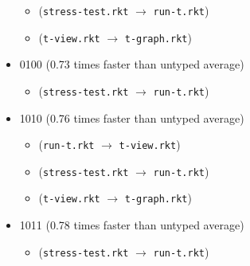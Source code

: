 \documentclass{article}
\newcommand{\mono}[1]{\texttt{#1}}
\begin{document}
\begin{itemize}
\begin{itemize}
  \item (\mono{stress-test.rkt} $\rightarrow$ \mono{run-t.rkt})
  \item (\mono{t-view.rkt} $\rightarrow$ \mono{t-graph.rkt})
  \end{itemize}
\item 0100 (0.73 times faster than untyped average)
  \begin{itemize}
  \item (\mono{stress-test.rkt} $\rightarrow$ \mono{run-t.rkt})
  \end{itemize}
\item 1010 (0.76 times faster than untyped average)
  \begin{itemize}
  \item (\mono{run-t.rkt} $\rightarrow$ \mono{t-view.rkt})
  \item (\mono{stress-test.rkt} $\rightarrow$ \mono{run-t.rkt})
  \item (\mono{t-view.rkt} $\rightarrow$ \mono{t-graph.rkt})
  \end{itemize}
\item 1011 (0.78 times faster than untyped average)
  \begin{itemize}
  \item (\mono{stress-test.rkt} $\rightarrow$ \mono{run-t.rkt})
  \end{itemize}


\end{itemize}
\end{document}
